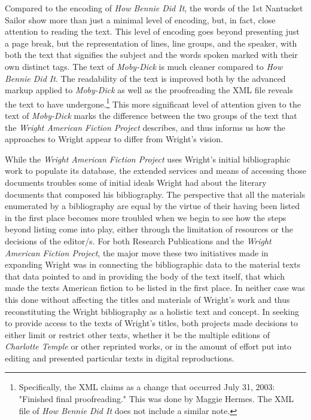 Compared to the encoding of \textit{How Bennie Did It}, the words of the 1st Nantucket Sailor show more than just a minimal level of encoding, but, in fact, close attention to reading the text. This level of encoding goes beyond presenting just a page break, but the representation of lines, line groups, and the speaker, with both the text that signifies the subject and the words spoken marked with their own distinct tags. The text of \textit{Moby-Dick} is much cleaner compared to \textit{How Bennie Did It}. The readability of the text is improved both by the advanced markup applied to \textit{Moby-Dick} as well as the proofreading the XML file reveals the text to have undergone.\footnote{Specifically, the XML claims as a change that occurred July 31, 2003: "Finished final proofreading." This was done by Maggie Hermes. The XML file of \textit{How Bennie Did It} does not include a similar note.} This more significant level of attention given to the text of \textit{Moby-Dick} marks the difference between the two groups of the text that the \textit{Wright American Fiction Project} describes, and thus informs us how the approaches to Wright appear to differ from Wright's vision. 

While the \textit{Wright American Fiction Project} uses Wright's initial bibliographic work to populate its database, the extended services and means of accessing those documents troubles some of initial ideals Wright had about the literary documents that composed his bibliography. The perspective that all the materials enumerated by a bibliography are equal by the virtue of their having been listed in the first place becomes more troubled when we begin to see how the steps beyond listing come into play, either through the limitation of resources or the decisions of the editor/s. For both Research Publications and the \textit{Wright American Fiction Project}, the major move these two initiatives made in expanding Wright was in connecting the bibliographic data to the material texts that data pointed to and in providing the body of the text itself, that which made the texts American fiction to be listed in the first place. In neither case was this done without affecting the titles and materials of Wright's work and thus reconstituting the Wright bibliography as a holistic text and concept. In seeking to provide access to the texts of Wright's titles, both projects made decisions to either limit or restrict other texts, whether it be the multiple editions of \textit{Charlotte Temple} or other reprinted works, or in the amount of effort put into editing and presented particular texts in digital reproductions.

